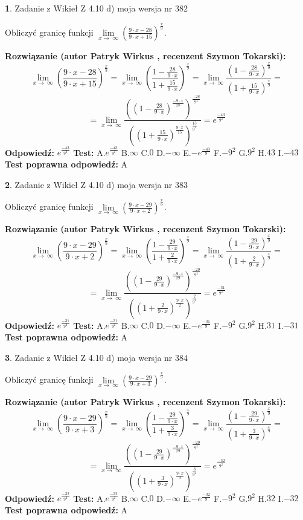 \documentclass[12pt, a4paper]{article}
\theoremstyle{definition} %
\newtheorem{zad}{}
\newcommand{\zadStart}[1]{\begin{zad}#1\newline}
\newcommand{\zadStop}{\end{zad}}
\newcommand{\rozwStart}[2]{\noindent \textbf{Rozwiązanie (autor #1 , recenzent #2): }\newline}
\newcommand{\rozwStop}{\newline}
\newcommand{\odpStart}{\noindent \textbf{Odpowiedź:}\newline}
\newcommand{\odpStop}{\newline}
\newcommand{\testStart}{\noindent \textbf{Test:}\newline}
\newcommand{\testStop}{\newline}
\newcommand{\kluczStart}{\noindent \textbf{Test poprawna odpowiedź:}\newline}
\newcommand{\kluczStop}{\newline}
\begin{document}
\zadStart{Zadanie z Wikieł Z 4.10 d) moja wersja nr 382}


Obliczyć granicę funkcji  $\lim\limits_{x\to\ \infty}(\frac{9\cdot x-28}{9\cdot x+15})^{\frac{x}{9}}$.
\zadStop
\rozwStart{Patryk Wirkus}{Szymon Tokarski}
$$\lim\limits_{x\to\ \infty}(\frac{9\cdot x-28}{9\cdot x+15})^{\frac{x}{9}} = \lim\limits_{x\to\ \infty}(\frac{1-\frac{28}{9\cdot x}}{1+\frac{15}{9\cdot x}})^{\frac{x}{9}}=\lim\limits_{x\to\ \infty}\frac{(1-\frac{28}{9\cdot x})^{\frac{x}{9}}}{(1+\frac{15}{9\cdot x})^{\frac{x}{9}}}=$$
$$=\lim\limits_{x\to\ \infty}\frac{((1-\frac{28}{9\cdot x})^{\frac{-9\cdot x}{28}})^{\frac{-28}{9^{2}}}}{((1+\frac{15}{9\cdot x})^{\frac{9\cdot x}{15}})^{\frac{15}{9^{2}}}}=e^{\frac{-43}{9^{2}}}$$
\rozwStop
\odpStart
$e^{\frac{-43}{9^{2}}}$
\odpStop
\testStart
A.$e^{\frac{-43}{9^{2}}}$ B.$\infty$ C.$0$ D.$-\infty$ E.$-e^{\frac{-43}{9}}$
F.$-9^{2}$ G.$9^{2}$
H.$43$
I.$-43$
\testStop
\kluczStart
A
\kluczStop



\zadStart{Zadanie z Wikieł Z 4.10 d) moja wersja nr 383}


Obliczyć granicę funkcji  $\lim\limits_{x\to\ \infty}(\frac{9\cdot x-29}{9\cdot x+2})^{\frac{x}{9}}$.
\zadStop
\rozwStart{Patryk Wirkus}{Szymon Tokarski}
$$\lim\limits_{x\to\ \infty}(\frac{9\cdot x-29}{9\cdot x+2})^{\frac{x}{9}} = \lim\limits_{x\to\ \infty}(\frac{1-\frac{29}{9\cdot x}}{1+\frac{2}{9\cdot x}})^{\frac{x}{9}}=\lim\limits_{x\to\ \infty}\frac{(1-\frac{29}{9\cdot x})^{\frac{x}{9}}}{(1+\frac{2}{9\cdot x})^{\frac{x}{9}}}=$$
$$=\lim\limits_{x\to\ \infty}\frac{((1-\frac{29}{9\cdot x})^{\frac{-9\cdot x}{29}})^{\frac{-29}{9^{2}}}}{((1+\frac{2}{9\cdot x})^{\frac{9\cdot x}{2}})^{\frac{2}{9^{2}}}}=e^{\frac{-31}{9^{2}}}$$
\rozwStop
\odpStart
$e^{\frac{-31}{9^{2}}}$
\odpStop
\testStart
A.$e^{\frac{-31}{9^{2}}}$ B.$\infty$ C.$0$ D.$-\infty$ E.$-e^{\frac{-31}{9}}$
F.$-9^{2}$ G.$9^{2}$
H.$31$
I.$-31$
\testStop
\kluczStart
A
\kluczStop



\zadStart{Zadanie z Wikieł Z 4.10 d) moja wersja nr 384}


Obliczyć granicę funkcji  $\lim\limits_{x\to\ \infty}(\frac{9\cdot x-29}{9\cdot x+3})^{\frac{x}{9}}$.
\zadStop
\rozwStart{Patryk Wirkus}{Szymon Tokarski}
$$\lim\limits_{x\to\ \infty}(\frac{9\cdot x-29}{9\cdot x+3})^{\frac{x}{9}} = \lim\limits_{x\to\ \infty}(\frac{1-\frac{29}{9\cdot x}}{1+\frac{3}{9\cdot x}})^{\frac{x}{9}}=\lim\limits_{x\to\ \infty}\frac{(1-\frac{29}{9\cdot x})^{\frac{x}{9}}}{(1+\frac{3}{9\cdot x})^{\frac{x}{9}}}=$$
$$=\lim\limits_{x\to\ \infty}\frac{((1-\frac{29}{9\cdot x})^{\frac{-9\cdot x}{29}})^{\frac{-29}{9^{2}}}}{((1+\frac{3}{9\cdot x})^{\frac{9\cdot x}{3}})^{\frac{3}{9^{2}}}}=e^{\frac{-32}{9^{2}}}$$
\rozwStop
\odpStart
$e^{\frac{-32}{9^{2}}}$
\odpStop
\testStart
A.$e^{\frac{-32}{9^{2}}}$ B.$\infty$ C.$0$ D.$-\infty$ E.$-e^{\frac{-32}{9}}$
F.$-9^{2}$ G.$9^{2}$
H.$32$
I.$-32$
\testStop
\kluczStart
A
\kluczStop
\end{document}
